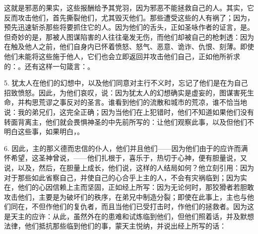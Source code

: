 这就是邪恶的果实，这些报酬给予其党羽，因为邪恶不能拯救自己的人。其实，它反而攻击他们，首先撕裂他们，尤其毁灭他们。那些遭受这些的人有祸了；因为，预先迅速斩杀那些将要抓住它的人。因为他们的舌头，正如圣咏作者的证言，是。但奇妙的是，那被人图谋陷害的人往往毫发无伤，而他们却被自己的枪刺透：因为在触及他人之前，他们自身内已怀着愤怒、怒气、恶意、诡诈、仇恨、刻薄。即使他们未能将这些施于他人，它们也会立即返回并攻击他们自己，正如他所祈求的：。还有这样一句箴言：。\par

5. 犹太人在他们的幻想中，以及他们同意对主行不义时，忘记了他们是在为自己招致愤怒。因此，为他们哀叹，说：因为犹太人的幻想确实是虚妄的，图谋害死生命，并构思荒谬之事反对的圣言。谁看到他们的流散和城市的荒凉，谁不恰当地说：我的弟兄们，这完全正确；因为当他们在上犯错时，他们不知道如果他们没有转面背离主，他们就会畏惧神圣的中先前所写的：让他们观察此事，以及但他们不明白这些事，如果明白，。\par

6. 因此，主的那义德而忠信的仆人，他们并且他们——因为他们由于的应许而满怀希望，这圣神曾说，——他们扎根于，喜乐于，热切于心神，便有胆量说，又说，以及，然后，在胆量上成长，他们说，这样的人结局如何？他立刻引用：因为对于那些如此省察自己，并使自己的心合乎上主的人，不会有灾祸临到；因为实在，他们的心因信赖上主而坚固，正如经上所写：因为无论何时，那狡猾者若胆敢攻击他们，主要是为破坏们的秩序，在弟兄中制造分裂；即使在此事上，主也与他们同在，不但作他们的复仇者，而且当他们已受打击时，作他们的拯救者。因为这是天主的应许：从此，虽然外在的患难和试炼临到他们，但他们照着话，并及默想法律，他们抵抗那些临到他们的事，蒙天主悦纳，并说出经上所写的话：\par


